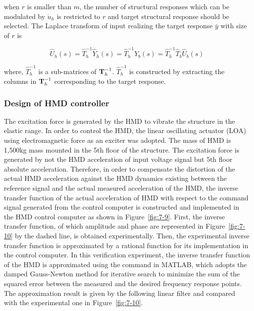 when $r$ is smaller than $m$, the number of structural responses which can be modulated by $\ddot{u}_{h}$ is restricted to $r$ and target structural response should be selected. The Laplace transform of input realizing the target response $\bar{y}$ with size of $r$ is

\begin{equation}\label{eq:7-14}
\hat{U}_{h}(s) = \hat{T}_{h}^{-1}\hat{Y}_{h}(s) = \hat{T}_{h}^{-1}\hat{Y}_{b}(s) = \hat{T}_{h}^{-1}\hat{T}_{b}\hat{U}_{b}(s)
\end{equation}

where, $\hat{T}_{h}^{-1}$ is a sub-matrices of $\mathbf{T}_{h}^{-1}$. $\hat{T}_{h}^{-1}$ is constructed by extracting the columns in $\mathbf{T}_{h}^{-1}$ corresponding to the target response.

\subsubsection{Design of HMD controller}\label{sec:7-5-2}
The excitation force is generated by the HMD to vibrate the structure in the elastic range. In order to control the HMD, the linear oscillating actuator (LOA) using electromagnetic force as an exciter was adopted. The mass of HMD is 1,500kg mass mounted in the 5th floor of the structure. The excitation force is generated by not the HMD acceleration of input voltage signal but 5th floor absolute acceleration. Therefore, in order to compensate the distortion of the actual HMD acceleration against the HMD dynamics existing between the reference signal and the actual measured acceleration of the HMD, the inverse transfer function of the actual acceleration of HMD with respect to the command signal generated from the control computer is constructed and implemented in the HMD control computer as shown in Figure~\ref{fig:7-9}. First, the inverse transfer function, of which amplitude and phase are represented in Figure~\ref{fig:7-10} by the dashed line, is obtained experimentally. Then, the experimental inverse transfer function is approximated by a rational function for its implementation in the control computer. In this verification experiment, the inverse transfer function of the HMD is approximated using the command  in MATLAB\citep{coleman1999optimization}, which adopts the damped Gauss-Newton method for iterative search to minimize the sum of the squared error between the measured and the desired frequency response points\citep{dennis1983numerical}. The approximation result is given by the following linear filter and compared with the experimental one in Figure~\ref{fig:7-10}.

